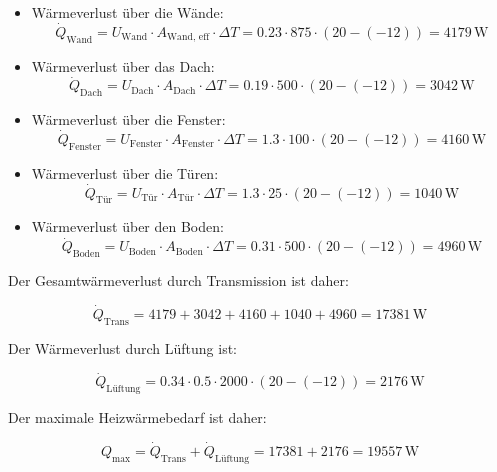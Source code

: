 \begin{itemize}
    \item Wärmeverlust über die Wände:
    \begin{equation}
    \dot{Q}_\text{Wand} = U_\text{Wand} \cdot A_\text{Wand, eff} \cdot \Delta T = 0.23 \cdot 875 \cdot (20 - (-12)) = 4179 \, \text{W}
    \end{equation}
    
    \item Wärmeverlust über das Dach:
    \begin{equation}
    \dot{Q}_\text{Dach} = U_\text{Dach} \cdot A_\text{Dach} \cdot \Delta T = 0.19 \cdot 500 \cdot (20 - (-12)) = 3042 \, \text{W}
    \end{equation}
    
    \item Wärmeverlust über die Fenster:
    \begin{equation}
    \dot{Q}_\text{Fenster} = U_\text{Fenster} \cdot A_\text{Fenster} \cdot \Delta T = 1.3 \cdot 100 \cdot (20 - (-12)) = 4160 \, \text{W}
    \end{equation}
    
    \item Wärmeverlust über die Türen:
    \begin{equation}
    \dot{Q}_\text{Tür} = U_\text{Tür} \cdot A_\text{Tür} \cdot \Delta T = 1.3 \cdot 25 \cdot (20 - (-12)) = 1040 \, \text{W}
    \end{equation}
    
    \item Wärmeverlust über den Boden:
    \begin{equation}
    \dot{Q}_\text{Boden} = U_\text{Boden} \cdot A_\text{Boden} \cdot \Delta T = 0.31 \cdot 500 \cdot (20 - (-12)) = 4960 \, \text{W}
    \end{equation}
\end{itemize}

Der Gesamtwärmeverlust durch Transmission ist daher:

\begin{equation}
\dot{Q}_\text{Trans} = 4179 + 3042 + 4160 + 1040 + 4960 = 17381 \, \text{W}
\end{equation}

Der Wärmeverlust durch Lüftung ist:

\begin{equation}
\dot{Q}_\text{Lüftung} = 0.34 \cdot 0.5 \cdot 2000 \cdot (20 - (-12)) = 2176 \, \text{W}
\end{equation}

Der maximale Heizwärmebedarf ist daher:

\begin{equation}
Q_\text{max} = \dot{Q}_\text{Trans} + \dot{Q}_\text{Lüftung} = 17381 + 2176 = 19557 \, \text{W}
\end{equation}